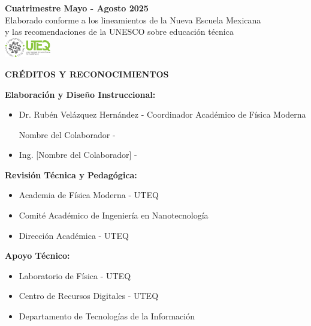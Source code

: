 \documentclass[12pt,a4paper]{book}
\begin{document}
\begin{titlepage}
\begin{center}
			\vfill
			
			{\large \textcolor{uteqgray}{\textbf{Cuatrimestre Mayo - Agosto 2025}}}\\[0.5cm]
			{\normalsize \textcolor{uteqgray}{Elaborado conforme a los lineamientos de la Nueva Escuela Mexicana}}\\
			{\normalsize \textcolor{uteqgray}{y las recomendaciones de la UNESCO sobre educación técnica}}\\[1cm]
			
			\hspace{2cm}
			\includegraphics[width=2cm]{../../Imagenes/Logo_uteq}
			
		\end{center}
	\end{titlepage}
	
	\thispagestyle{empty}
	\vspace*{2cm}
	
	\begin{center}
		\textbf{\Large CRÉDITOS Y RECONOCIMIENTOS}
	\end{center}
	
	\vspace{1cm}
	
	\textbf{Elaboración y Diseño Instruccional:}
	\begin{itemize}[leftmargin=2cm]
		\item Dr. Rubén Velázquez Hernández - Coordinador Académico de Física Moderna
		\item  [Nombre del Colaborador] - 
		\item Ing. [Nombre del Colaborador] -
	\end{itemize}
	
	\textbf{Revisión Técnica y Pedagógica:}
	\begin{itemize}[leftmargin=2cm]
		\item Academia de Física Moderna - UTEQ
		\item Comité Académico de Ingeniería en Nanotecnología
		\item Dirección Académica - UTEQ
	\end{itemize}
	
	\textbf{Apoyo Técnico:}
	\begin{itemize}[leftmargin=2cm]
		\item Laboratorio de Física - UTEQ
		\item Centro de Recursos Digitales - UTEQ
		\item Departamento de Tecnologías de la Información
	\end{itemize}
	
\end{document}
